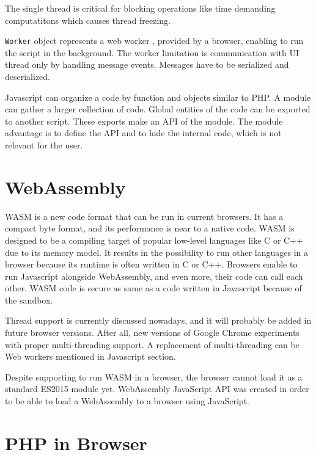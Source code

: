 The single thread is critical for blocking operations like time demanding computatitons which causes thread freezing.
\par
\texttt{Worker} object represents a web worker , provided by a browser, enabling to run the script in the background.
The worker limitation is communication with UI thread only by handling message events. 
Messages have to be serialized and deserialized.
\par
Javascript can organize a code by function and objects similar to PHP.
A module can gather a larger collection of code.
Global entities of the code can be exported to another script.
These exports make an API of the module.
The module advantage is to define the API and to hide the internal code, which is not relevant for the user.

\section{WebAssembly}

WASM  is a new code format that can be run in current browsers. 
It has a compact byte format, and its performance is near to a native code. 
WASM is designed to be a compiling target of popular low-level languages like C or C++ due to its memory model.
It results in the possibility to run other languages in a browser because its runtime is often written in C or C++.
Browsers enable to run Javascript alongside WebAssembly, and even more, their code can call each other.
WASM code is secure as same as a code written in Javascript because of the sandbox. 
\par
Thread  support is currently discussed nowadays, and it will probably be added in future browser versions.
After all, new versions of Google Chrome experiments with proper multi-threading support.
A replacement of multi-threading can be Web workers mentioned in Javascript section.
\par
Despite supporting to run WASM in a browser, the browser cannot load it as a standard ES2015 module yet.
WebAssembly JavaScript API was created in order to be able to load a WebAssembly to a browser using JavaScript.

\section{PHP in Browser}

